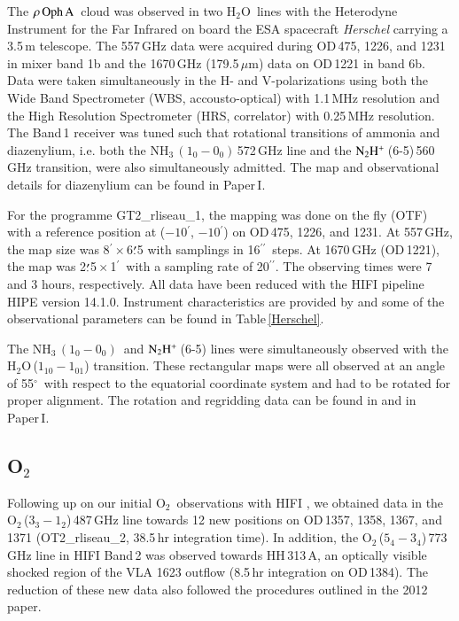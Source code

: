 \documentclass{aa}
\newcommand{\um}{$\mu$m}                                 %
\newcommand{\water}{H$_{2}$O}
\newcommand{\molo}{O$_{2}$}                     %
\newcommand{\ettnoll}{{\rm NH}$_3\,(1_0 - 0_0)$}
\newcommand{\ntwohp}{${\rm N_2H^+}$}
\newcommand{\roa}{$\rho \, {\rm Oph \, A}$}
\newcommand{\amin}{$^{\prime}$}                   %
\newcommand{\asec}{$^{\prime \prime}$}
\newcommand{\adeg}{$^{\circ}$}
\newcommand{\amindot}[2]{\mbox{#1$\stackrel {\prime}{_{\bf \cdot}}$#2}}
\begin{document}
%
%

The \roa\ cloud was observed in two \water\ lines with the Heterodyne Instrument for the Far Infrared \citep[HIFI,][]{degraauw2010} on board the ESA spacecraft {\it Herschel} \citep{pilbratt2010}  carrying a 3.5\,m telescope. The 557\,GHz data were acquired during OD\,475, 1226, and 1231 in mixer band 1b and the 1670\,GHz (179.5\,\um) data on OD\,1221 in band 6b. Data were taken simultaneously in the H- and V-polarizations using both the Wide Band Spectrometer (WBS, accousto-optical) with 1.1\,MHz resolution and the High Resolution Spectrometer (HRS, correlator) with 0.25\,MHz resolution. The Band\,1 receiver was tuned such that rotational transitions of ammonia and diazenylium, i.e. both the \ettnoll\,572\,GHz line and the \ntwohp\,(6-5)\,560\,GHz transition, were also simultaneously admitted. The map and observational details for diazenylium can be found in Paper\,I.

For the programme  GT2\_rliseau\_1, the mapping was done on the fly (OTF) with a reference position at  ($-10$\amin, $-10$\amin) on OD\,475, 1226, and 1231. At 557\,GHz, the map size was 8\amin\,$\times$\,\amindot{6}{5} with samplings in 16\asec\ steps. At 1670\,GHz (OD\,1221), the map was \amindot{2}{5}\,$\times$\,1\amin\ with a sampling rate of 20\asec. The observing times were 7 and 3 hours, respectively.  All data have been reduced with the HIFI pipeline HIPE version 14.1.0. Instrument characteristics are provided by \cite{roelfsema2012} and some of the observational parameters can be found in Table\,\ref{Herschel}.

The \ettnoll\ and \ntwohp\,(6-5) lines were simultaneously  observed with the \water\,($1_{10}-1_{01}$) transition. These rectangular maps were all observed at an angle of 55\adeg\ with respect to the equatorial coordinate system and had to be rotated for proper alignment. The rotation and regridding data can be found in \citet{bjerkeli2012} and in Paper\,I.
 
\subsection{\rm O$_2$}

Following up on our initial \molo\ observations with HIFI \citep{liseau2012}, we  obtained data in the  \molo\,($3_3-1_2$)\,487\,GHz line towards 12 new positions on OD\,1357, 1358, 1367, and 1371 (OT2\_rliseau\_2, 38.5\,hr integration time).  In addition, the \molo\,($5_4-3_4$)\,773\,GHz line in HIFI Band\,2 was observed towards HH\,313\,A, an optically visible shocked region of the VLA 1623 outflow (8.5\,hr integration on OD\,1384). The reduction of these new data also followed the procedures outlined in the 2012 paper. 
\end{document}
